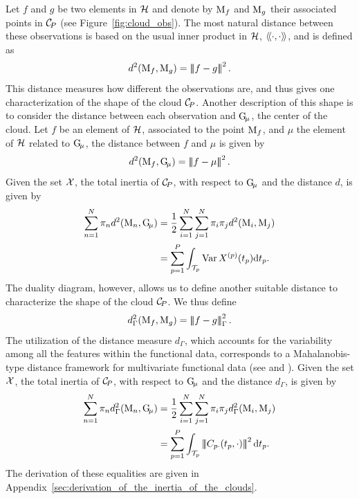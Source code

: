 Let $f$ and $g$ be two elements in $\mathcal{H}$ and denote by $\mathrm{M}_f$ and $\mathrm{M}_g$ their associated points in $\mathcal{C}_{\!P}$ (see Figure~\ref{fig:cloud_obs}). The most natural distance between these observations is based on the usual inner product in $\mathcal{H}$, $\langle\!\langle\cdot, \cdot\rangle\!\rangle$, and is defined as
\begin{equation}\label{eq:distance_obs}
    d^2(\pobs{M}_f, \pobs{M}_g) = \normH{f - g}^2. %
\end{equation}
This distance measures how different the observations are, and thus gives one characterization of the shape of the cloud $\mathcal{C}_{\!P}$. Another description of this shape is to consider the distance between each observation and $\mathrm{G}_{\!\mu}$, the center of the cloud. Let $f$ be an element of $\mathcal{H}$, associated to the point $\mathrm{M}_f$, and $\mu$ the element of $\mathcal{H}$ related to $\mathrm{G}_{\!\mu}$, the distance between $f$ and $\mu$ is given by
\begin{equation}\label{eq:distance_center}
    d^2(\pobs{M}_f, \Gmu) = \normH{f - \mu}^2. %
\end{equation}
Given the set $\mathcal{X}$, the total inertia of $\mathcal{C}_{\!P}$, with respect to $\mathrm{G}_{\!\mu}$ and the distance $d$, is given by
\begin{align}\label{eq:inertia}
    \sum_{n = 1}^N \pi_n d^2(\pobs{M}_n, \Gmu) &= \frac{1}{2}\sum_{i = 1}^N \sum_{j = 1}^N \pi_i \pi_j d^2(\pobs{M}_i, \pobs{M}_j) \\
    &= \sum_{p = 1}^P \int_{\TT{p}}\Var{\Xp{p}(t_p)} \dd t_p.
\end{align}
The duality diagram, however, allows us to define another suitable distance to characterize the shape of the cloud $\mathcal{C}_{\!P}$. We thus define
\begin{equation}
    d^2_\Gamma(\pobs{M}_f, \pobs{M}_g) = \normHG{f - g}^2.
\end{equation}
The utilization of the distance measure $d_\Gamma$, which accounts for the variability among all the features within the functional data, corresponds to a Mahalanobis-type distance framework for multivariate functional data (see \cite{berrenderoMahalanobisDistanceFunctional2020} and \cite{martinoKmeansProcedureBased2019}).
Given the set $\mathcal{X}$, the total inertia of $\mathcal{C}_{\!P}$, with respect to $\mathrm{G}_{\!\mu}$ and the distance $d_\Gamma$, is given by
\begin{align}\label{eq:inertia_CP}
    \sum_{n = 1}^N \pi_n d_\Gamma^2(\pobs{M}_n, \Gmu) &= \frac{1}{2}\sum_{i = 1}^N \sum_{j = 1}^N \pi_i \pi_j d_\Gamma^2(\pobs{M}_i, \pobs{M}_j) \\
    &= \sum_{p = 1}^P \int_{\TT{p}} \normH{C_{p \cdot}(t_p, \cdot)}^2 \dd t_p.
\end{align}
The derivation of these equalities are given in Appendix~\ref{sec:derivation_of_the_inertia_of_the_clouds}.

